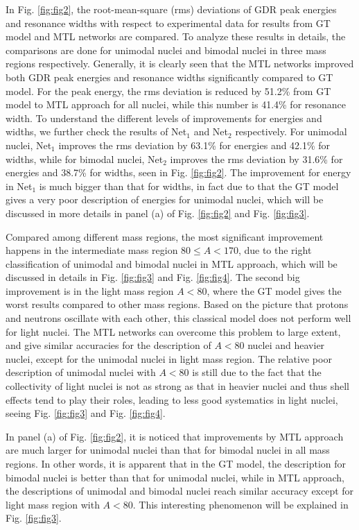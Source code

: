 \documentclass[twocolumn,showpacs,superscriptaddress,amsmath,amssymb,prc,preprintnumbers]{revtex4-1}
\begin{document}
In Fig. \ref{fig:fig2}, the root-mean-square (rms) deviations of GDR  peak energies and  resonance widths  with respect to experimental data for results from GT model and MTL networks are compared. To analyze these results in details, the comparisons  are done for unimodal nuclei and bimodal nuclei in three mass regions respectively. Generally, it is clearly seen that the MTL networks improved both GDR  peak energies and  resonance widths significantly compared to GT model. For the peak energy, the rms deviation is reduced by 51.2\% from GT model to MTL approach for all nuclei, while this number is 41.4\% for resonance width. To understand the different levels of improvements for energies and widths, we further check the results of Net$_1$ and Net$_2$ respectively.  For unimodal nuclei, Net$_1$ improves the rms deviation by 63.1\% for energies and 42.1\% for widths,  while for bimodal nuclei, Net$_2$ improves the rms deviation by 31.6\% for energies and 38.7\% for widths, seen in Fig. \ref{fig:fig2}. The improvement for energy in Net$_1$ is much bigger than that for widths, in fact due to that the GT model gives a very poor description of energies for unimodal nuclei, which will be discussed in more details in panel (a) of Fig. \ref{fig:fig2} and Fig. \ref{fig:fig3}.

Compared among different mass regions, the most significant improvement happens in the intermediate mass region $80\leq A<170$, due to the right classification of unimodal and bimodal nuclei in MTL approach, which will be discussed in details in Fig. \ref{fig:fig3} and Fig. \ref{fig:fig4}. The second big improvement is in the light mass region $A<80$, where the GT model gives the worst results compared to other mass regions. Based on the picture that protons and neutrons oscillate with each other, this classical model does not perform well for light nuclei. The MTL networks can overcome this problem to large extent, and give similar accuracies for the description of $A<80$ nuclei and heavier nuclei, except for the unimodal nuclei in light mass region. The relative poor description of unimodal nuclei with $A<80$ is still due to the fact that the collectivity of light nuclei is not as strong as that in heavier nuclei and thus shell effects tend to play their roles, leading to less good systematics in light nuclei, seeing Fig. \ref{fig:fig3} and Fig. \ref{fig:fig4}.

In panel (a) of Fig. \ref{fig:fig2}, it is noticed that improvements by MTL approach are much larger for unimodal nuclei than that for bimodal nuclei in all mass regions. In other words, it is apparent that in the GT model, the description for bimodal nuclei is better than that for unimodal nuclei, while in MTL approach, the descriptions of unimodal and bimodal nuclei reach similar accuracy except for light mass region with $A<80$. This interesting phenomenon will be explained in Fig. \ref{fig:fig3}.
\end{document}
